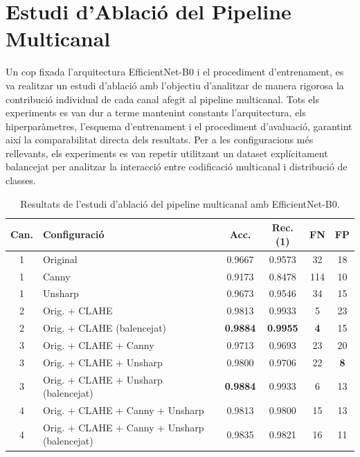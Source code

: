 \documentclass[conference]{IEEEtran}
\begin{document}

\section{Estudi d’Ablació del Pipeline Multicanal}

Un cop fixada l’arquitectura EfficientNet-B0 i el procediment d’entrenament, es va
realitzar un estudi d’ablació amb l’objectiu d’analitzar de manera rigorosa la contribució
individual de cada canal afegit al pipeline multicanal. Tots els experiments es van dur
a terme mantenint constants l’arquitectura, els hiperparàmetres, l’esquema
d’entrenament i el procediment d’avaluació, garantint així la comparabilitat directa
dels resultats. Per a les configuracions més rellevants, els experiments es van repetir
utilitzant un dataset explícitament balancejat per analitzar la interacció entre
codificació multicanal i distribució de classes.

\begin{table}[H]
\centering
\scriptsize
\renewcommand{\arraystretch}{1.1}
\begin{tabularx}{\columnwidth}{c X c c c c}
\toprule
\textbf{Can.} & \textbf{Configuració} & \textbf{Acc.} & \textbf{Rec.(1)} & \textbf{FN} & \textbf{FP} \\
\midrule
1 & Original & 0.9667 & 0.9573 & 32 & 18 \\
1 & Canny & 0.9173 & 0.8478 & 114 & 10 \\
1 & Unsharp & 0.9673 & 0.9546 & 34 & 15 \\
2 & Orig. + CLAHE & 0.9813 & 0.9933 & 5 & 23 \\
2 & Orig. + CLAHE (balencejat) & \textbf{0.9884} & \textbf{0.9955} & \textbf{4} & 15 \\
3 & Orig. + CLAHE + Canny & 0.9713 & 0.9693 & 23 & 20 \\
3 & Orig. + CLAHE + Unsharp & 0.9800 & 0.9706 & 22 & \textbf{8} \\
3 & Orig. + CLAHE + Unsharp (balencejat) & \textbf{0.9884} & 0.9933 & 6 & 13 \\
4 & Orig. + CLAHE + Canny + Unsharp & 0.9813 & 0.9800 & 15 & 13 \\
4 & Orig. + CLAHE + Canny + Unsharp (balencejat) & 0.9835 & 0.9821 & 16 & 11 \\
\bottomrule
\end{tabularx}
\caption{Resultats de l’estudi d’ablació del pipeline multicanal amb EfficientNet-B0.}
\label{tab:ablation_results}
\end{table}
\end{document}
